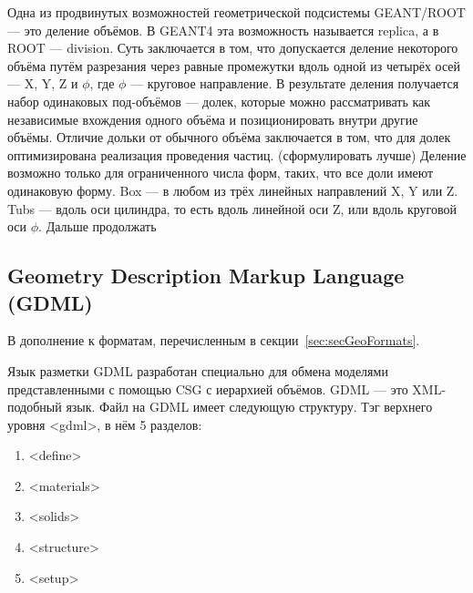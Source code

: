Одна из продвинутых возможностей геометрической подсистемы GEANT/ROOT --- это деление объёмов. В GEANT4 эта возможность называется replica, а в ROOT --- division. Суть заключается в том, что допускается деление некоторого объёма путём разрезания через равные промежутки вдоль одной из четырёх осей --- X, Y, Z и $\phi$, где $\phi$ --- круговое направление. В результате деления получается набор одинаковых под-объёмов --- долек, которые можно рассматривать как независимые вхождения одного объёма и позиционировать внутри другие объёмы. Отличие дольки от обычного объёма заключается в том, что для долек оптимизирована реализация проведения частиц. (\todo сформулировать лучше) Деление возможно только для ограниченного числа форм, таких, что все доли имеют одинаковую форму. Box --- в любом из трёх линейных направлений X, Y или Z. Tubs --- вдоль оси цилиндра, то есть вдоль линейной оси Z, или вдоль круговой оси $\phi$. Дальше продолжать\todo

%                           

\subsection{Geometry Description Markup Language (GDML)}\label{sec:secGDML}

\todo
В дополнение к форматам, перечисленным в секции~\ref{sec:secGeoFormats}.

Язык разметки GDML разработан специально для обмена моделями представленными с помощью CSG с иерархией объёмов. GDML --- это XML-подобный язык. Файл на GDML имеет следующую структуру. Тэг верхнего уровня <gdml>, в нём 5 разделов:
\begin{enumerate}
\item <define>
\item <materials>
\item <solids>
\item <structure>
\item <setup>
\end{enumerate}

